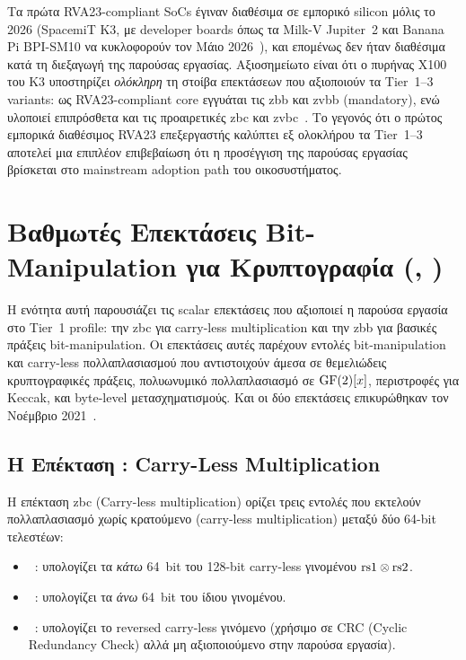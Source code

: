 Τα πρώτα RVA23-compliant SoCs έγιναν διαθέσιμα σε εμπορικό
silicon μόλις το 2026 (SpacemiT K3, με developer boards όπως τα Milk-V
Jupiter~2 και Banana Pi BPI-SM10 να κυκλοφορούν τον Μάιο
2026~\cite{SpacemiT-K3}), και επομένως δεν ήταν διαθέσιμα κατά τη διεξαγωγή
της παρούσας εργασίας. Αξιοσημείωτο είναι ότι ο πυρήνας X100 του
K3 υποστηρίζει \emph{ολόκληρη} τη στοίβα επεκτάσεων που αξιοποιούν τα
Tier~1--3 variants: ως RVA23-compliant core εγγυάται τις \gls{zbb} και
\gls{zvbb} (mandatory), ενώ υλοποιεί επιπρόσθετα και τις
προαιρετικές \gls{zbc} και \gls{zvbc}~\cite{SpacemiT-K3-datasheet}. Το γεγονός ότι ο πρώτος εμπορικά διαθέσιμος RVA23 επεξεργαστής καλύπτει εξ
ολοκλήρου τα Tier~1--3 αποτελεί μια επιπλέον επιβεβαίωση ότι η προσέγγιση της παρούσας
εργασίας βρίσκεται στο mainstream adoption path του οικοσυστήματος.


\section{Βαθμωτές Επεκτάσεις Bit-Manipulation για Κρυπτογραφία (\Zbb, \Zbc)}
\label{sec:scalar-extensions}

Η ενότητα αυτή παρουσιάζει τις scalar επεκτάσεις που αξιοποιεί η παρούσα
εργασία στο Tier~1 profile: την \gls{zbc} για carry-less multiplication και
την \gls{zbb} για βασικές πράξεις bit-manipulation. Οι επεκτάσεις αυτές
παρέχουν
εντολές bit-manipulation και carry-less πολλαπλασιασμού που αντιστοιχούν άμεσα
σε θεμελιώδεις κρυπτογραφικές πράξεις, πολυωνυμικό πολλαπλασιασμό σε
$\mathrm{GF}(2)[x]$, περιστροφές για Keccak, και byte-level μετασχηματισμούς. Και
οι δύο επεκτάσεις επικυρώθηκαν τον Νοέμβριο 2021~\cite{RISCV-bitmanip-spec,RISCV-ratified-ext}.

\subsection{Η Επέκταση \Zbc: Carry-Less Multiplication}
\label{ssec:zbc-extension}

Η επέκταση \gls{zbc} (Carry-less multiplication) ορίζει τρεις εντολές που εκτελούν
πολλαπλασιασμό χωρίς κρατούμενο (carry-less multiplication) μεταξύ δύο
64-bit τελεστέων:

\begin{itemize}
  \item \clmul~: υπολογίζει τα \emph{κάτω} 64~bit του
    128-bit carry-less γινομένου $\text{rs1} \otimes \text{rs2}$.
  \item \clmulh~: υπολογίζει τα \emph{άνω} 64~bit του
    ίδιου γινομένου.
  \item {}~: υπολογίζει το reversed
    carry-less γινόμενο (χρήσιμο σε CRC (Cyclic Redundancy Check) αλλά μη αξιοποιούμενο στην
    παρούσα εργασία).
\end{itemize}

